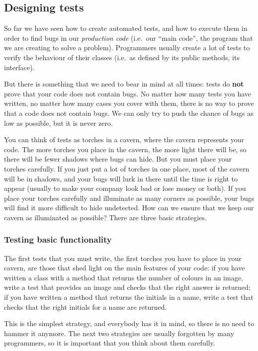 \subsection{Designing tests}
\label{sec:designing-tests}

So far we have seen how to create automated tests, and how to execute
them in order to find bugs in our \emph{production code} (i.e.~our
``main code'', the program that we are creating to solve a
problem). Programmers usually create a lot of tests to verify the
behaviour of their classes (i.e.~as defined by its public methods, its
interface). 

But there is something that we need to bear in mind at all
times: tests do \textbf{not} prove that your code does not contain
bugs. No matter how many tests you have written, no matter how many
cases you cover with them, there is no way to prove that a code does
not contain bugs. We can only try to push the chance of bugs as low as
possible, but it is never zero.

You can think of tests as torches in a cavern, where the cavern
represents your code. The more
torches you place in the cavern, the more light there will be, so there
will be fewer shadows where bugs can hide. But you must place your
torches carefully. If you just put a lot of torches in one place, most
of the cavern will be in shadows, and your bugs will lurk in there until
the time is right to appear (usually to make your company look bad or
lose money or both). If you place your torches carefully and
illuminate as many corners as possible, your bugs will find it more
difficult to hide undetected. How can we ensure that we keep our
cavern as illuminated as possible? There are three basic strategies.

\subsubsection{Testing basic functionality}
\label{sec:test-basic-funct}

The first tests that you must write, the first torches you have to
place in your cavern, are those that shed light on the main features
of your code: if you have written a class with a method that returns
the number of colours in an image, write a test that provides an image
and checks that the right answer is returned; if you have written a
method that returns the initials in a name, write a test that checks
that the right initials for a name are returned. 

This is the simplest strategy, and everybody has it in mind, so there
is no need to hammer it anymore. The next two strategies are usually
forgotten by many programmers, so it is important that you think about
them carefully. 

